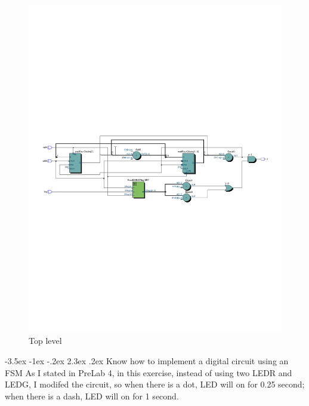 \documentclass[13pt,a4paper]{report}
\makeatletter
\renewcommand\section{\@startsection {section}{1}{-1em}%
  {-3.5ex \@plus -1ex \@minus -.2ex}%
  {2.3ex \@plus.2ex}%
  {\normalfont\Large\bfseries}}
\makeatother
\begin{document}
\begin{figure}[H]
\centering
\includegraphics[scale=0.85, clip, trim={0cm 11cm 0cm 11cm}]{images/Exc3_RTL.pdf}
\caption*{Top level}
\end{figure}


\newpage
\section{Know how to implement a digital circuit using an FSM}
As I stated in PreLab 4, in this exercise, instead of using two LEDR and LEDG, I modifed the circuit, so when there is a dot, LED will on for 0.25 second; when there is a dash, LED will on for 1 second.
\end{document}
